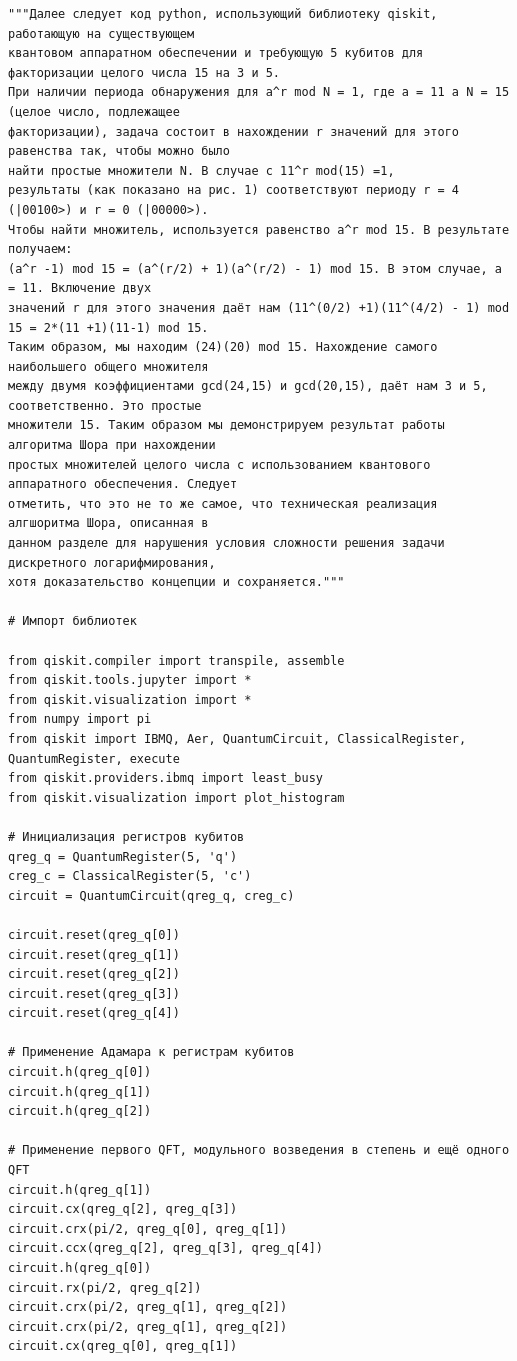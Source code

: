\documentclass{mrl}
\begin{document}
\begin{verbatim}
"""Далее следует код python, использующий библиотеку qiskit, работающую на существующем
квантовом аппаратном обеспечении и требующую 5 кубитов для факторизации целого числа 15 на 3 и 5.
При наличии периода обнаружения для a^r mod N = 1, где a = 11 а N = 15 (целое число, подлежащее
факторизации), задача состоит в нахождении r значений для этого равенства так, чтобы можно было
найти простые множители N. В случае с 11^r mod(15) =1,
результаты (как показано на рис. 1) соответствуют периоду r = 4 (|00100>) и r = 0 (|00000>).
Чтобы найти множитель, используется равенство a^r mod 15. В результате получаем:
(a^r -1) mod 15 = (a^(r/2) + 1)(a^(r/2) - 1) mod 15. В этом случае, a = 11. Включение двух
значений r для этого значения даёт нам (11^(0/2) +1)(11^(4/2) - 1) mod 15 = 2*(11 +1)(11-1) mod 15.
Таким образом, мы находим (24)(20) mod 15. Нахождение самого наибольшего общего множителя
между двумя коэффициентами gcd(24,15) и gcd(20,15), даёт нам 3 и 5, соответственно. Это простые
множители 15. Таким образом мы демонстрируем результат работы алгоритма Шора при нахождении
простых множителей целого числа с использованием квантового аппаратного обеспечения. Следует
отметить, что это не то же самое, что техническая реализация алгшоритма Шора, описанная в
данном разделе для нарушения условия сложности решения задачи дискретного логарифмирования, 
хотя доказательство концепции и сохраняется."""

# Импорт библиотек

from qiskit.compiler import transpile, assemble
from qiskit.tools.jupyter import *
from qiskit.visualization import *
from numpy import pi
from qiskit import IBMQ, Aer, QuantumCircuit, ClassicalRegister, QuantumRegister, execute
from qiskit.providers.ibmq import least_busy
from qiskit.visualization import plot_histogram

# Инициализация регистров кубитов
qreg_q = QuantumRegister(5, 'q')
creg_c = ClassicalRegister(5, 'c')
circuit = QuantumCircuit(qreg_q, creg_c)

circuit.reset(qreg_q[0])
circuit.reset(qreg_q[1])
circuit.reset(qreg_q[2])
circuit.reset(qreg_q[3])
circuit.reset(qreg_q[4])

# Применение Адамара к регистрам кубитов
circuit.h(qreg_q[0])
circuit.h(qreg_q[1])
circuit.h(qreg_q[2])

# Применение первого QFT, модульного возведения в степень и ещё одного QFT
circuit.h(qreg_q[1])
circuit.cx(qreg_q[2], qreg_q[3])
circuit.crx(pi/2, qreg_q[0], qreg_q[1])
circuit.ccx(qreg_q[2], qreg_q[3], qreg_q[4])
circuit.h(qreg_q[0])
circuit.rx(pi/2, qreg_q[2])
circuit.crx(pi/2, qreg_q[1], qreg_q[2])
circuit.crx(pi/2, qreg_q[1], qreg_q[2])
circuit.cx(qreg_q[0], qreg_q[1])


\end{verbatim}
\end{document}
